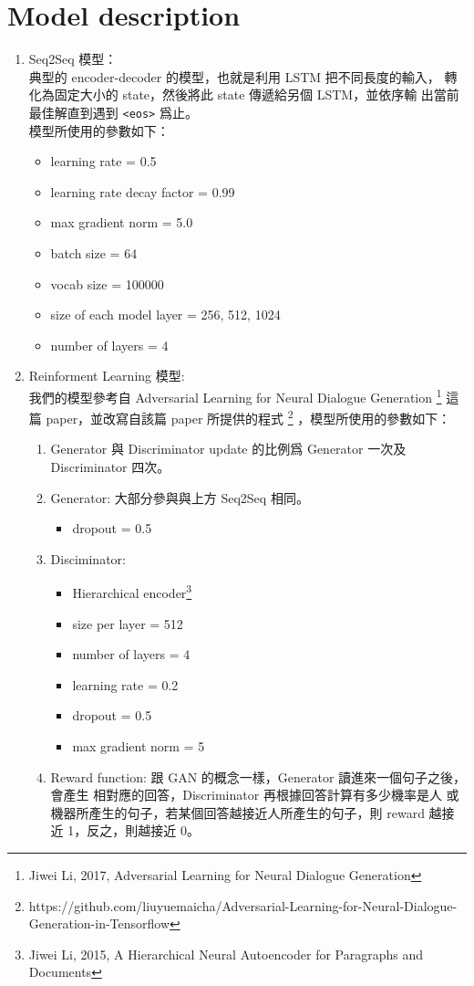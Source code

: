 \documentclass[12pt, a4paper]{article}
\theoremstyle{mystyle}	%
\begin{document}
\section{Model description}
\begin{enumerate}
\item Seq2Seq 模型：\\
典型的 encoder-decoder 的模型，也就是利用 LSTM 把不同長度的輸入，
轉化為固定大小的 state，然後將此 state 傳遞給另個 LSTM，並依序輸
出當前最佳解直到遇到 \texttt{<eos>} 爲止。\\
模型所使用的參數如下：
\begin{itemize}
  \item learning rate = 0.5
  \item learning rate decay factor = 0.99
  \item max gradient norm = 5.0
  \item batch size = 64
  \item vocab size = 100000
  \item size of each model layer = {256, 512, 1024}
  \item number of layers = 4
\end{itemize}
\item Reinforment Learning 模型: \\
  我們的模型參考自 Adversarial Learning for Neural Dialogue Generation 
  \footnote{Jiwei Li, 2017, Adversarial Learning for Neural Dialogue Generation}
  這篇 paper，並改寫自該篇 paper 所提供的程式
  \footnote{https://github.com/liuyuemaicha/Adversarial-Learning-for-Neural-Dialogue-Generation-in-Tensorflow}
  ，模型所使用的參數如下：
\begin{enumerate}
  \item Generator 與 Discriminator update 的比例爲
    Generator 一次及 Discriminator 四次。
  \item Generator:
    大部分參與與上方 Seq2Seq 相同。
    \begin{itemize}
    \item dropout = 0.5
    \end{itemize}
  \item Disciminator:
    \begin{itemize}
    \item Hierarchical encoder\footnote{Jiwei Li, 2015, A Hierarchical Neural Autoencoder for Paragraphs and Documents}
    \item size per layer = 512
    \item number of layers = 4
    \item learning rate = 0.2
    \item dropout = 0.5
    \item max gradient norm = 5
    \end{itemize}
  \item Reward function:
    跟 GAN 的概念一樣，Generator 讀進來一個句子之後，會產生
    相對應的回答，Discriminator 再根據回答計算有多少機率是人
    或機器所產生的句子，若某個回答越接近人所產生的句子，則
    reward 越接近 1，反之，則越接近 0。


\end{enumerate}
\end{enumerate}
\end{document}
